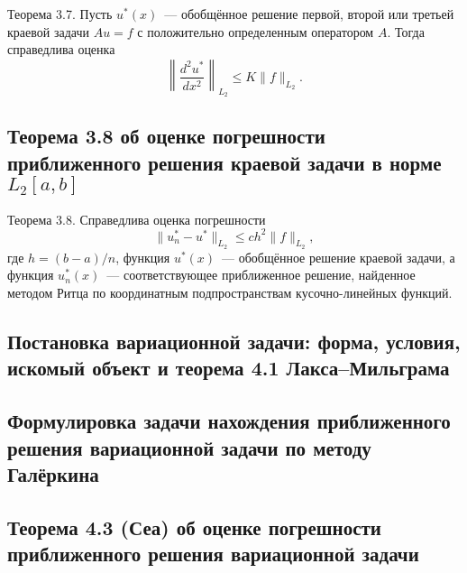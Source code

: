 \documentclass[a4paper,14pt]{article} %
\begin{document}
Теорема 3.7. Пусть $u^*(x)$~--- обобщённое решение первой,
второй или третьей краевой задачи $Au = f$
с положительно определенным оператором $A$.
Тогда справедлива оценка
\begin{equation}
	\left\|
		\frac{d^2 u^*}{dx^2}
	\right\|_{L_2}
	\leq K \|f\|_{L_2}
	.
\end{equation}


\subsection{Теорема 3.8 об оценке погрешности приближенного решения краевой задачи в норме $L_2[a,b]$}

Теорема 3.8.
Справедлива оценка погрешности
\begin{equation}
	\|u^*_n - u^* \|_{L_2} \leq c h^2 \|f\|_{L_2}
	,
\end{equation}
где $h = (b - a)/n$, функция $u^* (x)$~--- обобщённое решение краевой задачи,
а функция $u^*_n (x)$~--- соответствующее приближенное решение,
найденное методом Ритца по координатным подпространствам кусочно-линейных функций.


\subsection{Постановка вариационной задачи: форма, условия, искомый объект и теорема 4.1 Лакса--Мильграма}

\subsection{Формулировка задачи нахождения приближенного решения вариационной задачи по методу Галёркина}

\subsection{Теорема 4.3 (Сеа) об оценке погрешности приближенного решения вариационной задачи}
\end{document}
